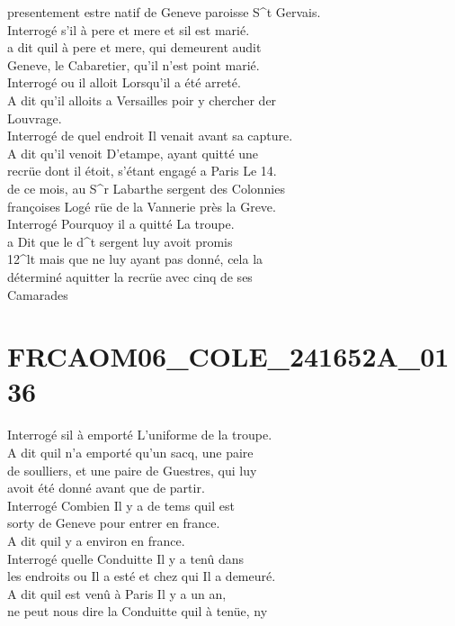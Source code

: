 \documentclass{article}
\begin{document}
\begin{pages}
presentement estre natif de Geneve paroisse S\^{}t Gervais.\\
Interrogé s'il à pere et mere et sil est marié.\\
a dit quil à pere et mere, qui demeurent audit\\
Geneve, le Cabaretier, qu'il n'est point marié.\\
Interrogé ou il alloit Lorsqu'il a été arreté.\\
A dit qu'il alloits a Versailles poir y chercher der\\
Louvrage.\\
Interrogé de quel endroit Il venait avant sa capture.\\
A dit qu'il venoit D'etampe, ayant quitté une\\
recrüe dont il étoit, s'étant engagé a Paris Le 14.\\
de ce mois, au S\^{}r Labarthe sergent des Colonnies\\
françoises Logé rüe de la Vannerie près la Greve.\\
Interrogé Pourquoy il a quitté La troupe.\\
a Dit que le d\^{}t sergent luy avoit promis\\
12\^{}lt mais que ne luy ayant pas donné, cela la\\
déterminé aquitter la recrüe avec cinq de ses\\
Camarades
\pend
\endnumbering\beginnumbering\section{FRCAOM06\_COLE\_241652A\_0136}\pstart
Interrogé sil à emporté L'uniforme de la troupe.\\
A dit quil n'a emporté qu'un sacq, une paire\\
de soulliers, et une paire de Guestres, qui luy\\
avoit été donné avant que de partir.\\
Interrogé Combien Il y a de tems quil est\\
sorty de Geneve pour entrer en france.\\
A dit quil y a environ en france.\\
Interrogé quelle Conduitte Il y a tenû dans\\
les endroits ou Il a esté et chez qui Il a demeuré.\\
A dit quil est venû à Paris Il y a un an,\\
ne peut nous dire la Conduitte quil à tenüe, ny\\

\end{pages}
\end{document}
